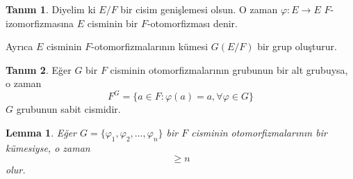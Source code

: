 \documentclass{article}
\newtheorem{lem}[thm]{Lemma}
\theoremstyle{definition}
\newtheorem{defn}{Tanım}[section]
\theoremstyle{remark}
\begin{document}
    	    \begin{defn}
    	        Diyelim ki $E/F$ bir cisim genişlemesi olsun. O zaman $\varphi: E \to E$ $F$-izomorfizmasına $E$ cisminin bir $F$-otomorfizması denir.\par
    	        Ayrıca $E$ cisminin $F$-otomorfizmalarının kümesi $G(E/F)$ bir grup oluşturur.
    	    \end{defn}
    		
    		\begin{defn}
    		    Eğer $G$ bir $F$ cisminin otomorfizmalarının grubunun bir alt grubuysa, o zaman
    		    \begin{equation*}
    				F^G = \{a \in F : \varphi(a) = a, \forall \varphi \in G\}
    			\end{equation*}
    			$G$ grubunun sabit cismidir.
    		\end{defn}
    		
    		\begin{lem}\label{5.3}
    		    Eğer $G = \{\varphi_1, \varphi_2, \dots, \varphi_n\}$ bir $F$ cisminin otomorfizmalarının bir kümesiyse, o zaman
    		    \begin{equation*}
    				[F : F^G] \geq n
    			\end{equation*}
    			olur.
    		\end{lem}
    		
\end{document}
